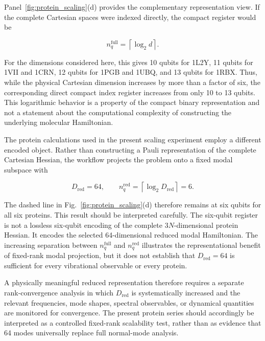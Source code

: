 \documentclass[aip,jcp,reprint,amsmath,amssymb,floatfix]{revtex4-2}
\begin{document}
Panel~\ref{fig:protein_scaling}(d) provides the complementary representation
view. If the complete Cartesian spaces were indexed directly, the compact
register would be

\begin{equation}
n_q^{\mathrm{full}}
=
\left\lceil \log_2 d \right\rceil .
\end{equation}

For the dimensions considered here, this gives 10 qubits for 1L2Y, 11 qubits
for 1VII and 1CRN, 12 qubits for 1PGB and 1UBQ, and 13 qubits for 1RBX.
Thus, while the physical Cartesian dimension increases by more than a factor
of six, the corresponding direct compact index register increases from only
10 to 13 qubits. This logarithmic behavior is a property of the compact binary
representation and not a statement about the computational complexity of
constructing the underlying molecular Hamiltonian.

The protein calculations used in the present scaling experiment employ a
different encoded object. Rather than constructing a Pauli representation of
the complete Cartesian Hessian, the workflow projects the problem onto a fixed
modal subspace with

\begin{equation}
D_{\mathrm{red}} = 64,
\qquad
n_q^{\mathrm{red}}
=
\left\lceil \log_2 D_{\mathrm{red}} \right\rceil
=
6 .
\end{equation}

The dashed line in Fig.~\ref{fig:protein_scaling}(d) therefore remains at six
qubits for all six proteins. This result should be interpreted carefully.
The six-qubit register is not a lossless six-qubit encoding of the complete
$3N$-dimensional protein Hessian. It encodes the selected 64-dimensional
reduced modal Hamiltonian. The increasing separation between
$n_q^{\mathrm{full}}$ and $n_q^{\mathrm{red}}$ illustrates the representational
benefit of fixed-rank modal projection, but it does not establish that
$D_{\mathrm{red}}=64$ is sufficient for every vibrational observable or every
protein.

A physically meaningful reduced representation therefore requires a separate
rank-convergence analysis in which $D_{\mathrm{red}}$ is systematically
increased and the relevant frequencies, mode shapes, spectral observables, or
dynamical quantities are monitored for convergence. The present protein series
should accordingly be interpreted as a controlled fixed-rank scalability test,
rather than as evidence that 64 modes universally replace full normal-mode
analysis.
\end{document}
